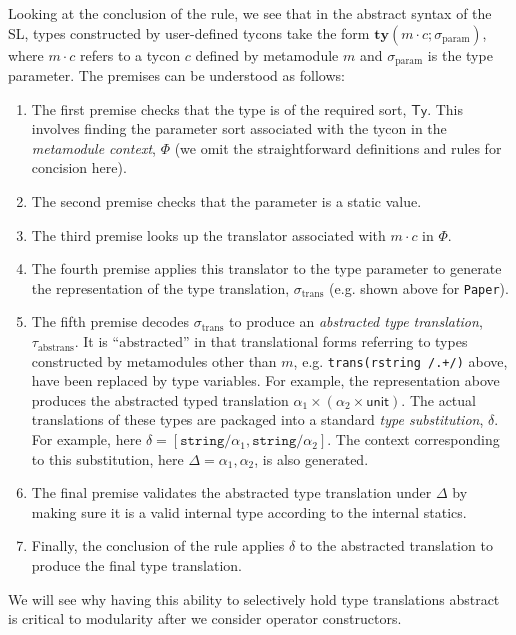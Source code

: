 Looking at the conclusion of the rule, we see that in the abstract syntax of the SL, types constructed by user-defined tycons take the form $\textbf{ty}(m\cdot c; \sigma_\text{param})$, where $m\cdot c$ refers to a  {tycon} $c$ defined by metamodule $m$ and $\sigma_\text{param}$ is the type parameter. The premises can be understood as follows:
\begin{enumerate}
\item The first premise checks that the type is of the required sort, $\mathsf{Ty}$. This involves finding the parameter sort associated with the tycon in the \emph{metamodule context}, $\Phi$ (we omit the straightforward definitions and rules for concision here).
\item The second premise checks that the parameter is a static value. %
\item The third premise looks up the translator associated with $m \cdot c$ in $\Phi$. 
\item The fourth premise applies this translator to the type parameter to generate the representation of the type translation, $\sigma_\text{trans}$ (e.g. shown above for \lstinline{Paper}).
\item The fifth premise decodes $\sigma_\text{trans}$ to produce an \emph{abstracted type translation}, $\tau_\text{abstrans}$. It is ``abstracted'' in that translational forms referring to types constructed by metamodules other than $m$, e.g. \lstinline{trans(rstring /.+/)} above, have been replaced by type variables. For example, the representation above produces the abstracted typed translation $\alpha_1 \times (\alpha_2 \times \mathsf{unit})$. The actual translations of these types are packaged into a standard \emph{type substitution}, $\delta$. For example, here $\delta = [\texttt{string}/\alpha_1, \texttt{string}/\alpha_2]$. The context corresponding to this substitution, here $\Delta=\alpha_1, \alpha_2$, is also generated.
\item The final premise validates the abstracted type translation under $\Delta$ by making sure it is a valid internal type according to the internal statics.
\item Finally, the conclusion of the rule applies $\delta$ to the abstracted translation to produce the final type translation.
\end{enumerate}

We will see why having this ability to selectively hold type translations abstract is critical to modularity after we consider operator constructors.

